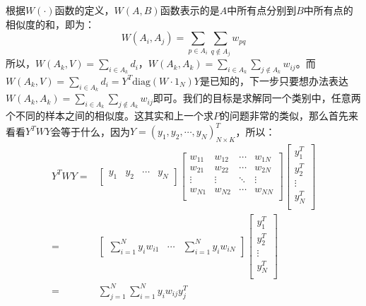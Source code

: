 \documentclass[a4paper]{article}
\begin{document}
根据$W(\cdot)$函数的定义，$W(A,B)$函数表示的是$A$中所有点分别到$B$中所有点的相似度的和，即为：
\begin{equation}
    W(A_i,A_j) = \sum_{p\in A_i} \sum_{q\notin A_j} w_{pq}
\end{equation}
所以，$ W(A_k,V) = \sum_{i\in A_k} d_i$，$W(A_k,A_k) = \sum_{i\in A_k} \sum_{j\notin A_k} w_{ij}$。而$W(A_k,V) = \sum_{i\in A_k} d_i = Y^T\mathrm{diag}(W\cdot 1_N)Y$是已知的，下一步只要想办法表达$W(A_k,A_k) = \sum_{i\in A_k} \sum_{j\notin A_k} w_{ij}$即可。我们的目标是求解同一个类别中，任意两个不同的样本之间的相似度。这其实和上一个求$P$的问题非常的类似，那么首先来看看$Y^TWY$会等于什么，因为$Y = (y_1,y_2,\cdots,y_N)^T_{N\times K}$，所以：
\begin{equation}
    \begin{split}
        Y^TWY = &
        \begin{bmatrix}
        y_1 & y_2 & \cdots & y_N \\
        \end{bmatrix}
        \begin{bmatrix}
        w_{11} & w_{12} & \cdots & w_{1N} \\
        w_{21} & w_{22} & \cdots & w_{2N} \\
        \vdots & \vdots & \ddots & \vdots \\
        w_{N1} & w_{N2} & \cdots & w_{NN} \\
        \end{bmatrix}
        \begin{bmatrix}
        y_1^T \\ y_2^T \\ \vdots \\ y_N^T \\
        \end{bmatrix} \\
        = & 
        \begin{bmatrix}
        \sum_{i=1}^N y_iw_{i1} & \cdots & \sum_{i=1}^N y_iw_{iN}
        \end{bmatrix}
        \begin{bmatrix}
        y_1^T \\ y_2^T \\ \vdots \\ y_N^T \\
        \end{bmatrix} \\
        = & \sum_{j=1}^N \sum_{i=1}^N y_iw_{ij}y_j^T
    \end{split}
\end{equation}
\end{document}
